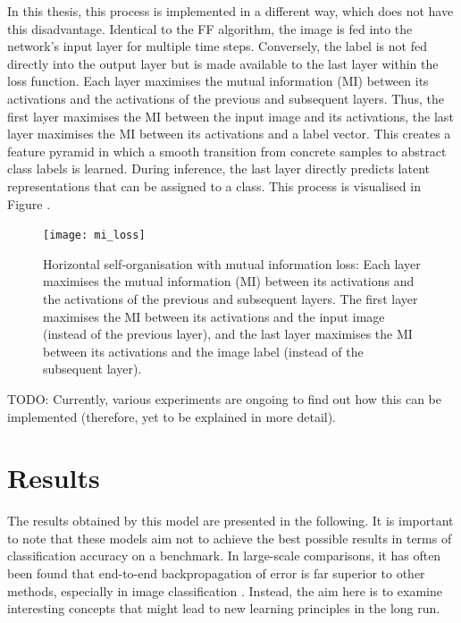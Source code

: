 In this thesis, this process is implemented in a different way, which does not have this disadvantage. Identical to the FF algorithm, the image is fed into the network's input layer for multiple time steps. Conversely, the label is not fed directly into the output layer but is made available to the last layer within the loss function. Each layer maximises the mutual information (MI) between its activations and the activations of the previous and subsequent layers. Thus, the first layer maximises the MI between the input image and its activations, the last layer maximises the MI between its activations and a label vector. This creates a feature pyramid in which a smooth transition from concrete samples to abstract class labels is learned. During inference, the last layer directly predicts latent representations that can be assigned to a class. This process is visualised in Figure . 

\begin{figure}[h]
    \centering
    \texttt{[image: mi\_loss]}
    \caption[Horizontal self-organisation with mutual information loss]{Horizontal self-organisation with mutual information loss: Each layer maximises the mutual information (MI) between its activations and the activations of the previous and subsequent layers. The first layer maximises the MI between its activations and the input image (instead of the previous layer), and the last layer maximises the MI between its activations and the image label (instead of the subsequent layer).}
\end{figure}




TODO: Currently, various experiments are ongoing to find out how this can be implemented (therefore, yet to be explained in more detail).




\section{Results}
The results obtained by this model are presented in the following. It is important to note that these models aim not to achieve the best possible results in terms of classification accuracy on a benchmark. In large-scale comparisons, it has often been found that end-to-end backpropagation of error is far superior to other methods, especially in image classification . Instead, the aim here is to examine interesting concepts that might lead to new learning principles in the long run.

